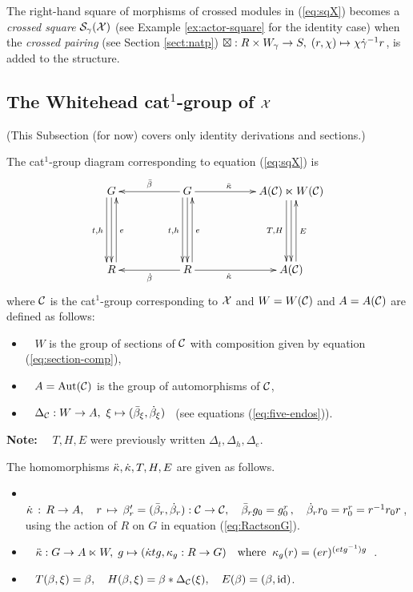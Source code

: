 \bigskip 
The right-hand square of morphisms of crossed modules in (\ref{eq:sqX})
becomes a \emph{crossed square} $\mathcal{S}_{\gamma}(\mathcal{X})$ 
(see Example \ref{ex:actor-square} for the identity case) 
when the \emph{crossed pairing} (see Section \ref{sect:natp}) 
$\boxtimes : R \times W_{\gamma} \to S,\; (r,\chi) \mapsto \chi \dot{\gamma}^{-1} r$, 
is added to the structure. 



\subsection{The Whitehead cat$^1$-group of $\mathcal{X}$} \label{subs:Whitehead-cat1}

(This Subsection (for now) covers only identity derivations and sections.) 

\medskip\noindent
The cat$^1$-group diagram corresponding to equation (\ref{eq:sqX}) is
\begin{equation} \label{eq:sqC}
\vcenter{\xymatrix{
  G \ar[dd]  \ar[dd] <-1.0ex>_{t,h}
    &&  G \ar[ll]_{\barb}  \ar[rr]^(0.4){\ddk}
          \ar[dd]  \ar[dd] <-1.0ex>_{t,h}
       &&  A(\calC) \ltimes W(\calC)  
            \ar[dd]  \ar[dd] <-1.0ex>_{T,H}  \\
    && &&   \\
  R \ar[uu] <-1.0ex>_e 
    &&  R \ar[uu] <-1.0ex>_e \ar[ll]^{\db} \ar[rr]_(0.4){\dk}
       &&  A(\calC) \ar[uu] <-1.0ex>_{E} \\
}} 
\end{equation}
where $\mathcal{C}$ is the cat$^1$-group corresponding to $\mathcal{X}$ 
and $W = W(\mathcal{C})$ and $A = A(\mathcal{C})$ are defined as follows:
\begin{itemize}
\item~
$W$ is the group of sections of $\mathcal{C}$
with composition given by equation (\ref{eq:section-comp}),
\item~
$A=\mathrm{Aut}(\mathcal{C})$ is the group of automorphisms of $\mathcal{C}$,
\item~
$\Delta_{\mathcal{C}} : W \to A,~
\xi \mapsto (\bar{\beta}_{\xi}, \dot{\beta}_{\xi})$~
(see equations (\ref{eq:five-endos})).
\end{itemize}

\noindent
{\bf Note:}~~ $T,H,E$ were previously written $\Delta_t,\Delta_h,\Delta_e$. 

\bigskip\noindent
The homomorphisms 
$\ddot{\kappa}, \dot{\kappa}, T, H, E$ are given as follows.
\begin{itemize}
\item~
$\dot{\kappa} \,:\, R \to A, \quad
r \,\mapsto\, \beta'_r = (\bar{\beta}_r,\dot{\beta}_r) : \mathcal{C} \to \mathcal{C},
\quad  \bar{\beta}_r g_0 = g_0^r\,,
\quad  \dot{\beta}_r r_0 = r_0^r = r^{-1}r_0r$\,,\\
using the action of $R$ on $G$ in equation (\ref{eq:RactsonG}).
\item~
$\ddot{\kappa} : G \to A \ltimes W,\;
g \mapsto (\dot{\kappa} tg, \kappa_g : R \to G)
\quad\mbox{where}\;\;  \kappa_g(r) = (er)^{(etg^{-1})g}$~.
\item~
$T(\beta,\xi) = \beta, \quad
H(\beta,\xi) = \beta \ast \Delta_{\mathcal{C}}(\xi), \quad
E(\beta) = (\beta,\mathrm{id})$.
\end{itemize}

